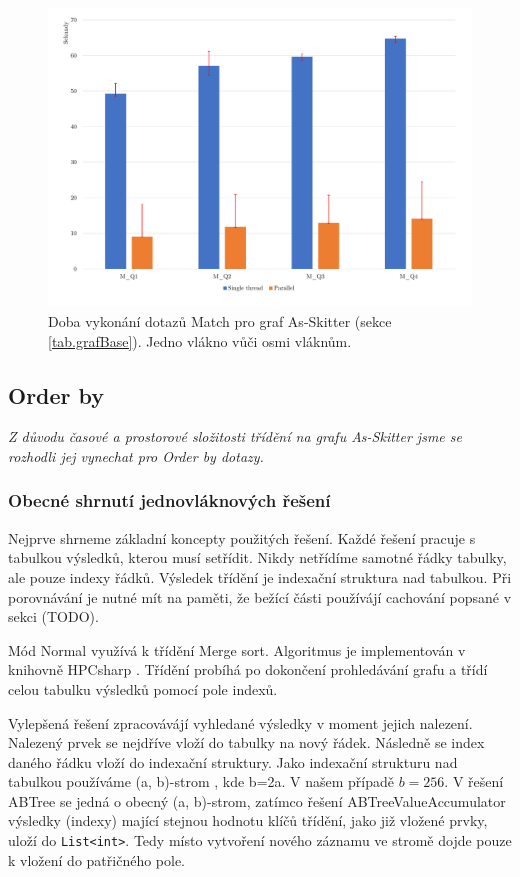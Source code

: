 \begin{figure}[!htp]
\includegraphics[width=\linewidth]{../img/skitterMatch.pdf}\centering
\caption{Doba vykonání dotazů Match pro graf As-Skitter (sekce \ref{tab.grafBase}). Jedno vlákno vůči osmi vláknům.}
\label{figure.skitterMatch}
\end{figure}


\subsection{Order by}

\textit{Z důvodu časové a prostorové složitosti třídění na grafu As-Skitter jsme se rozhodli jej vynechat pro Order by dotazy.}

\subsubsection{Obecné shrnutí jednovláknových řešení}

Nejprve shrneme základní koncepty použitých řešení.
Každé řešení pracuje s tabulkou výsledků, kterou musí setřídit.
Nikdy netřídíme samotné řádky tabulky, ale pouze indexy řádků.
Výsledek třídění je indexační struktura nad tabulkou.
Při porovnávání je nutné mít na paměti, že bežící části používájí cachování popsané v sekci (TODO).  

Mód Normal využívá k třídění Merge sort.
Algoritmus je implementován v knihovně HPCsharp \citep{hpcsharp}.
Třídění probíhá po dokončení prohledávání grafu a třídí celou tabulku výsledků pomocí pole indexů.

Vylepšená řešení zpracovávájí vyhledané výsledky v moment jejich nalezení.
Nalezený prvek se nejdříve vloží do tabulky na nový řádek. 
Následně se index daného řádku vloží do indexační struktury. 
Jako indexační strukturu nad tabulkou používáme (a, b)-strom \citep[03. (a, b)-trees]{dataLecture}, kde b=2a.
V našem případě $b=256$.
V řešení ABTree se jedná o obecný (a, b)-strom, zatímco řešení ABTreeValueAccumulator výsledky (indexy) mající stejnou hodnotu klíčů třídění, jako již vložené prvky, uloží do \verb+List<int>+.
Tedy místo vytvoření nového záznamu ve stromě dojde pouze k vložení do patřičného pole.


